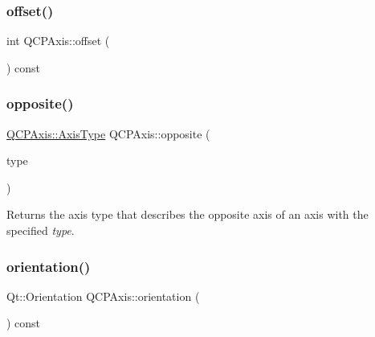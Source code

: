 \mbox{\label{class_q_c_p_axis_aef66fa16353b4993b1cceabfb644a1a9}} 
\subsubsection{\texorpdfstring{offset()}{offset()}}
{\footnotesize\ttfamily int Q\+C\+P\+Axis\+::offset (\begin{DoxyParamCaption}{ }\end{DoxyParamCaption}) const}

\mbox{\label{class_q_c_p_axis_aa85ba73dfee6483e23825461b725e363}} 
\subsubsection{\texorpdfstring{opposite()}{opposite()}}
{\footnotesize\ttfamily \mbox{\hyperlink{class_q_c_p_axis_ae2bcc1728b382f10f064612b368bc18a}{Q\+C\+P\+Axis\+::\+Axis\+Type}} Q\+C\+P\+Axis\+::opposite (\begin{DoxyParamCaption}\item[{\mbox{\hyperlink{class_q_c_p_axis_ae2bcc1728b382f10f064612b368bc18a}{Q\+C\+P\+Axis\+::\+Axis\+Type}}}]{type }\end{DoxyParamCaption})\hspace{0.3cm}{\ttfamily [static]}}

Returns the axis type that describes the opposite axis of an axis with the specified {\itshape type}. \mbox{\label{class_q_c_p_axis_ab988ef4538e2655bb77bd138189cd42e}} 
\subsubsection{\texorpdfstring{orientation()}{orientation()}\hspace{0.1cm}{\footnotesize\ttfamily [1/2]}}
{\footnotesize\ttfamily Qt\+::\+Orientation Q\+C\+P\+Axis\+::orientation (\begin{DoxyParamCaption}{ }\end{DoxyParamCaption}) const\hspace{0.3cm}{\ttfamily [inline]}}

